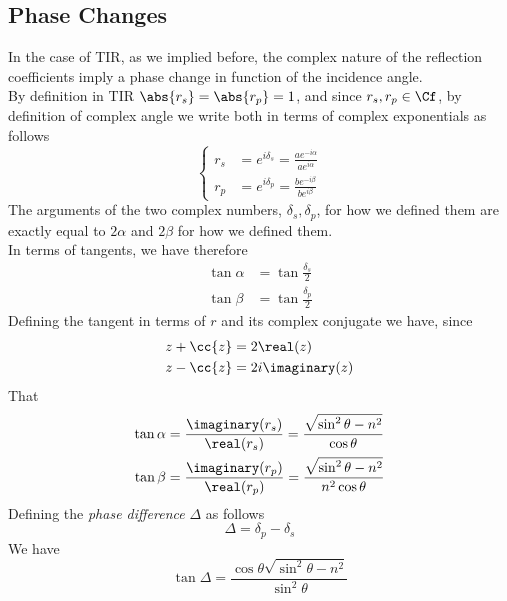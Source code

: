 \documentclass[../electromagnetism.tex]{subfiles}
\begin{document}
\subsection{Phase Changes}
In the case of TIR, as we implied before, the complex nature of the reflection coefficients imply a phase change in function of the incidence angle.\\
By definition in TIR $\abs{r_s}=\abs{r_p}=1$, and since $r_s,r_p\in\Cf$, by definition of complex angle we write both in terms of complex exponentials as follows
\begin{equation}
	\left\{ \begin{aligned}
			r_s&= e^{i\delta_s}=\frac{ae^{-i\alpha}}{ae^{i\alpha}}\\
			r_p&= e^{i\delta_p}=\frac{be^{-i\beta}}{be^{i\beta}}
	\end{aligned}\right.
	\label{eq:redefrsrptir}
\end{equation}
The arguments of the two complex numbers, $\delta_s,\delta_p$, for how we defined them are exactly equal to $2\alpha$ and $2\beta$ for how we defined them.\\
In terms of tangents, we have therefore
\begin{equation*}
	\begin{aligned}
		\tan\alpha&= \tan\frac{\delta_s}{2}\\
		\tan\beta&= \tan\frac{\delta_p}{2}
	\end{aligned}
\end{equation*}
Defining the tangent in terms of $r$ and its complex conjugate we have, since
\begin{equation*}
	\begin{aligned}
		z+\cc{z}&=2\real(z)\\
		z-\cc{z}&= 2i\imaginary(z)
	\end{aligned}
\end{equation*}
That
\begin{equation}
	\begin{aligned}
		\tan\alpha&= \frac{\imaginary(r_s)}{\real(r_s)}=\frac{\sqrt{\sin^2\theta-n^2}}{\cos\theta}\\
		\tan\beta&= \frac{\imaginary(r_p)}{\real(r_p)}=\frac{\sqrt{\sin^2\theta-n^2}}{n^2\cos\theta}
	\end{aligned}
	\label{eq:tanalphabeta1}
\end{equation}
Defining the \emph{phase difference} $\Delta$ as follows
\begin{equation*}
	\Delta=\delta_p-\delta_s
\end{equation*}
We have
\begin{equation}
	\tan\Delta=\frac{\cos\theta\sqrt{\sin^2\theta-n^2}}{\sin^2\theta}
	\label{eq:phasedifference}
\end{equation}
\end{document}

